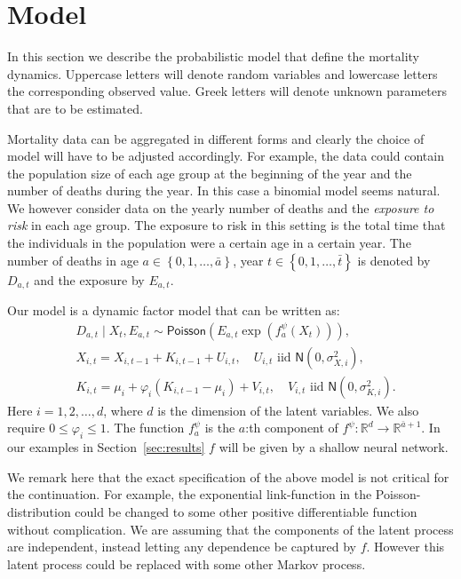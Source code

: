 \documentclass[preprint,12pt]{elsarticle}
\newcommand{\cur}[1]{\left\{#1\right\}}
\newcommand{\pa}[1]{\left(#1\right)}
\begin{document}
\section{Model}\label{sec:model}
In this section we describe the probabilistic model that define the mortality dynamics. Uppercase letters will denote random variables and lowercase letters the corresponding observed value. Greek letters will denote unknown parameters that are to be estimated. 

Mortality data can be aggregated in different forms and clearly the choice of model will have to be adjusted accordingly. For example, the data could contain the population size of each age group at the beginning of the year and the number of deaths during the year. In this case a binomial model seems natural. We however consider data on the yearly number of deaths and the \emph{exposure to risk} in each age group. The exposure to risk in this setting is the total time that the individuals in the population were a certain age in a certain year.  The number of deaths in age $a\in \cur{0,1,\ldots, \bar a}$, year $t\in \cur{0,1,\ldots, \bar t}$ is denoted by $D_{a,t}$ and the exposure by $E_{a,t}$. 

Our model is a dynamic factor model that can be written as:
\begin{align}
	& D_{a,t}\mid X_t,E_{a,t} \sim  \mathsf{Poisson}\pa{E_{a,t}\exp\pa{f^\psi_{a}(X_t)}},\label{eq:deathDist}\\
	& X_{i,t} =X_{i,t-1} + K_{i,t-1} + U_{i,t},\quad U_{i,t} \text{ iid }  \mathsf{N}(0,\sigma^2_{X,i}),\label{eq:state_level}\\
	& K_{i,t} = \mu_i + \varphi_i(K_{i,t-1} - \mu_i) + V_{i,t},\quad V_{i,t} \text{ iid }   \mathsf{N}(0,\sigma^2_{K,i}).\label{eq:state_trend}
\end{align}
Here $i=1,2,\ldots , d$, where $d$ is the dimension of the latent variables. We also require $0\leq \varphi_i \leq 1$. The function $f^\psi_a$ is the $a$:th component of $f^\psi:\mathbb R^d \to \mathbb R^{\bar a+1}$. In our examples in Section~\ref{sec:results} $f$ will be given by a shallow neural network.

We remark here that the exact specification of the above model is not critical for the continuation. For example, the exponential link-function in the Poisson-distribution could be changed to some other positive differentiable function without complication. We are assuming that the components of the latent process are independent, instead letting any dependence  be captured by $f$. However this latent process could be replaced with some other Markov process.
\end{document}
